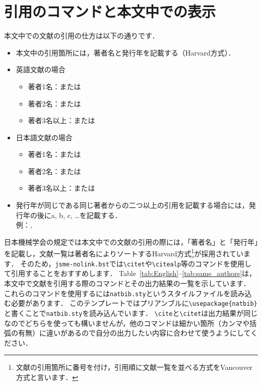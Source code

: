 \documentclass[a4paper,fleqn,uplatex,dvipdfmx]{jsarticle}
\newcommand{\jsmefile}{\texttt{jsme-nolink.bst}}
\begin{document}
\section{引用のコマンドと本文中での表示}
\label{sec:cite}
本文中での文献の引用の仕方は以下の通りです．
\begin{itembox}[l]{}
    \begin{itemize}
        \item 本文中の引用箇所には，著者名と発行年を記載する（Harvard方式）．
        \item 英語文献の場合
        \begin{itemize}
            \item 著者1名：\citet{Reynolds:PhilTransRoySoc1883}または\citep{Reynolds:PhilTransRoySoc1883}
            \item 著者2名：\citet{Schmid:Springer2001}または\citep{Schmid:Springer2001}
            \item 著者3名以上：\citet{Berghout:JFM2020}または\citep{Berghout:JFM2020}
        \end{itemize}
        \item 日本語文献の場合
        \begin{itemize}
            \item 著者1名：\citet{塚原:ながれ2023}または\citep{塚原:ながれ2023}
            \item 著者2名：\citet{塚原:ながれ2015}または\citep{塚原:ながれ2015}
            \item 著者3名以上：\citet{塚原:伝熱2007}または\citep{塚原:伝熱2007}
        \end{itemize}
        \item 発行年が同じである同じ著者からの二つ以上の引用を記載する場合には，発行年の後にa, b, c, \ldots を記載する． \\
        例：\citet{Matsukawa:ICFD2022}, \citet{松川:東北大SENAC2022}
\end{itemize}
\end{itembox}

日本機械学会の規定では本文中での文献の引用の際には，「著者名」と「発行年」を記載し，文献一覧は著者名によりソートするHarvard方式\footnote{文献の引用箇所に番号を付け，引用順に文献一覧を並べる方式をVancouver方式と言います．}が採用されています．
そのため，\jsmefile では\verb|\citet|や\verb|\citealp|等のコマンドを使用して引用することをおすすめします．
Table~\ref{tab:English}--\ref{tab:same_authors}は，本文中で文献を引用する際のコマンドとその出力結果の一覧を示しています．
これらのコマンドを使用するには\verb|natbib.sty|というスタイルファイルを読み込む必要があります．
このテンプレートではプリアンブルに\verb|\usepackage{natbib}|と書くことで\verb|natbib.sty|を読み込んでいます．
\verb|\cite|と\verb|\citet|は出力結果が同じなのでどちらを使っても構いませんが，他のコマンドは細かい箇所（カンマや括弧の有無）に違いがあるので自分の出力したい内容に合わせて使うようにしてください．
\end{document}

